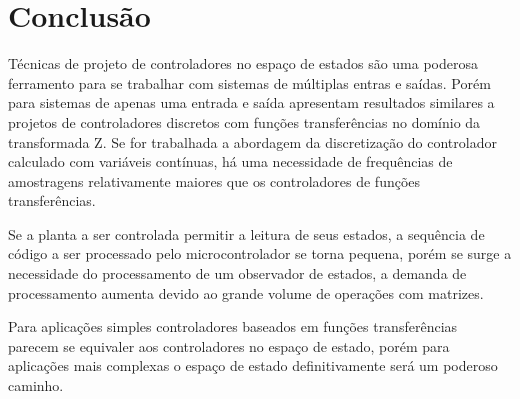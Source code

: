 \documentclass[
	article,			%
	11pt,				%
	oneside,			%
	a4paper,			%
	english,			%
	brazil,				%
	sumario=tradicional
	]{abntex2}
\begin{document}
\pagebreak

\section{\textbf{Conclusão}}
 
Técnicas de projeto de controladores no espaço de estados são uma poderosa ferramento para se trabalhar com sistemas de múltiplas entras e saídas. Porém para sistemas de apenas uma entrada e saída apresentam resultados similares a projetos de controladores discretos com funções transferências no domínio da transformada Z. Se for trabalhada a abordagem da discretização do controlador calculado com variáveis contínuas, há uma necessidade de frequências de amostragens relativamente maiores que os controladores de funções transferências.

Se a planta a ser controlada permitir a leitura de seus estados, a sequência de código a ser processado pelo microcontrolador se torna pequena, porém se surge a necessidade do processamento de um observador de estados, a demanda de processamento aumenta devido ao grande volume de operações com matrizes.

Para aplicações simples controladores baseados em funções transferências parecem se equivaler aos controladores no espaço de estado, porém para aplicações mais complexas o espaço de estado definitivamente será um poderoso caminho.
%
%
%
%
\pagebreak

\postextual




%
%

\end{document}
